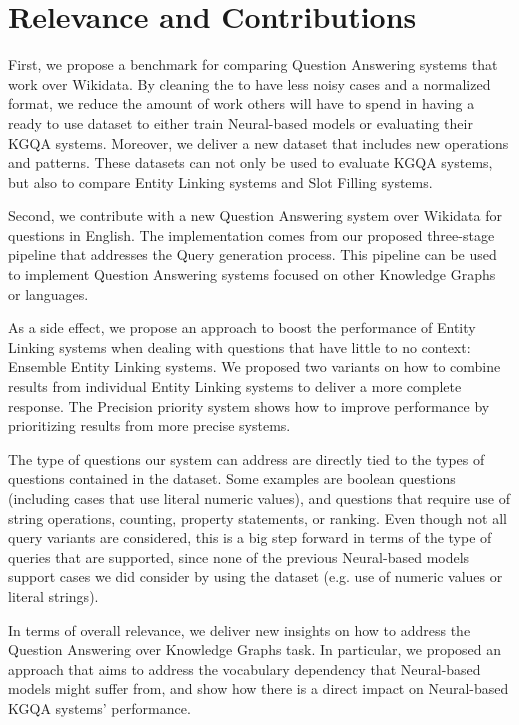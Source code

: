 \section{Relevance and Contributions}
\label{cap6:conclusions/relevanceContributions}
First, we propose a benchmark for comparing Question Answering systems that work over Wikidata. By 
cleaning the \LCQuADtwo{} to have less noisy cases and a normalized format, we reduce the amount of 
work others will have to spend in having a ready to use dataset to either train Neural-based models 
or evaluating their KGQA systems. Moreover, we deliver a new dataset that includes new \SPARQL{} 
operations and patterns. These datasets can not only be used to evaluate KGQA systems, but also to 
compare Entity Linking systems and Slot Filling systems.

Second, we contribute with a new Question Answering system over Wikidata for questions in English. 
The implementation comes from our proposed three-stage pipeline that addresses the \SPARQL{} Query 
generation process. This pipeline can be used to implement Question Answering systems focused on 
other Knowledge Graphs or languages. 

As a side effect, we propose an approach to boost the performance of Entity Linking systems when 
dealing with questions that have little to no context: Ensemble Entity Linking systems. We proposed 
two variants on how to combine results from individual Entity Linking systems to deliver a more 
complete response. The Precision priority system shows how to improve performance by prioritizing 
results from more precise systems. 

The type of questions our system can address are directly tied to the types of questions contained in 
the \LCQuADtwo{} dataset. Some examples are boolean questions (including cases that use literal numeric 
values), and questions that require use of string operations, counting, property statements, or 
ranking. Even though not all query variants are considered, this is a big step forward in terms of 
the type of queries that are supported, since none of the previous Neural-based models support cases 
we did consider by using the \LCQuADtwo{} dataset (e.g. use of numeric values or literal strings). 

In terms of overall relevance, we deliver new insights on how to address the Question Answering over 
Knowledge Graphs task. In particular, we proposed an approach that aims to address the vocabulary 
dependency that Neural-based models might suffer from, and show how there is a direct impact on 
Neural-based KGQA systems’ performance. 

